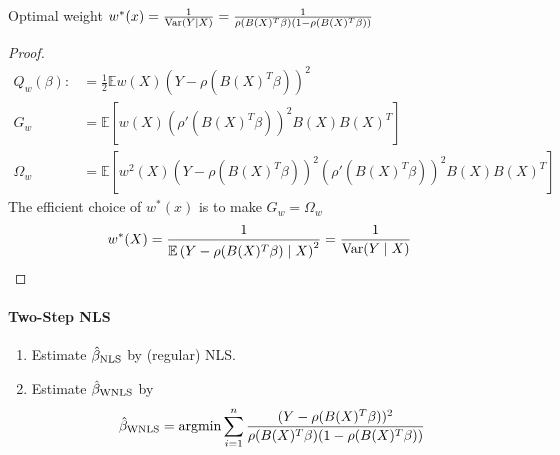 \documentclass[11pt]{elegantbook}
\newcommand{\argmin}{\operatornamewithlimits{argmin}}
\begin{document}
\begin{claim}
    Optimal weight $w^*(x)=\frac{1}{\textnormal{Var}(Y|X)}=\frac{1}{\rho(B(X)^T\beta)(1-\rho(B(X)^T\beta))}$
\end{claim}
\begin{proof}
    \begin{equation}
        \begin{aligned}
            Q_w(\beta):&=\frac{1}{2}\mathbb{E}w(X)(Y-\rho(B(X)^T\beta))^2\\
            G_w&=\mathbb{E}\left[w(X)(\rho'(B(X)^T\beta))^2B(X)B(X)^T\right]\\
            \Omega_w&=\mathbb{E}\left[w^2(X)\left(Y-\rho(B(X)^T\beta)\right)^2\left(\rho'(B(X)^T\beta)\right)^2B(X)B(X)^T\right]
        \end{aligned}
        \nonumber
    \end{equation}
    The efficient choice of $w^*(x)$ is to make $G_w=\Omega_w$
    \begin{equation}
        \begin{aligned}
            w^*(X)=\frac{1}{\mathbb{E}\left(Y-\rho(B(X)^T\beta)\mid X\right)^2}=\frac{1}{\textnormal{Var}(Y\mid X)}
        \end{aligned}
        \nonumber
    \end{equation}
\end{proof}

\paragraph*{Two-Step NLS}
\begin{enumerate}
    \item Estimate $\hat{\beta}_\textnormal{NLS}$ by (regular) NLS.
    \item Estimate $\hat{\beta}_\textnormal{WNLS}$ by
    \begin{equation}
        \begin{aligned}
            \hat{\beta}_\textnormal{WNLS}=\argmin \sum_{i=1}^n \frac{(Y-\rho(B(X)^T\beta))^2}{\rho(B(X)^T\beta)(1-\rho(B(X)^T\beta))}
        \end{aligned}
        \nonumber
    \end{equation}
\end{enumerate}
\end{document}
